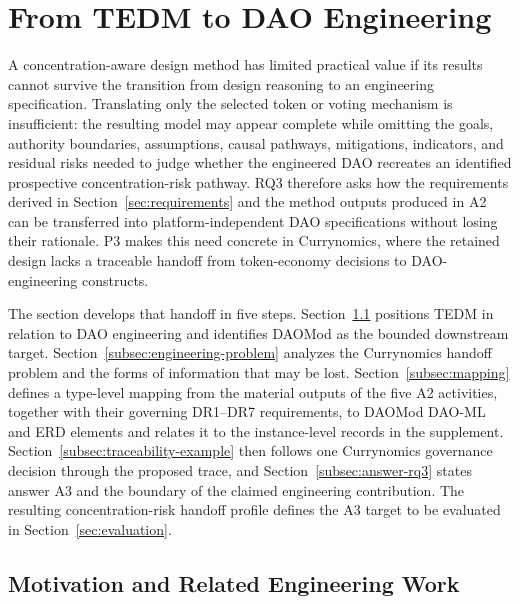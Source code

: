 \documentclass[referee,sn-basic]{sn-jnl}
\begin{document}
\section{From TEDM to DAO Engineering}\label{sec:engineering}

A concentration-aware design method has limited practical value if its results
cannot survive the transition from design reasoning to an engineering
specification. Translating only the selected token or voting mechanism is
insufficient: the resulting model may appear complete while omitting the goals,
authority boundaries, assumptions, causal pathways, mitigations, indicators,
and residual risks needed to judge whether the engineered DAO recreates an
identified prospective concentration-risk pathway. RQ3 therefore asks how the requirements derived in
Section~\ref{sec:requirements} and the method outputs produced in A2 can be transferred into
platform-independent DAO specifications without losing their rationale. P3
makes this need concrete in Currynomics, where the retained design lacks a
traceable handoff from token-economy decisions to DAO-engineering constructs.

The section develops that handoff in five steps. Section~\ref{subsec:engineering-motivation}
positions TEDM in relation to DAO engineering and identifies DAOMod as the
bounded downstream target. Section~\ref{subsec:engineering-problem} analyzes
the Currynomics handoff problem and the forms of information that may be lost.
Section~\ref{subsec:mapping} defines a type-level mapping from the material
outputs of the five A2 activities, together with their governing DR1--DR7
requirements, to DAOMod DAO-ML and ERD elements and relates it to the instance-level
records in the supplement. Section~\ref{subsec:traceability-example} then follows one
Currynomics governance decision through the proposed trace, and
Section~\ref{subsec:answer-rq3} states answer A3 and the boundary of the claimed
engineering contribution. The resulting concentration-risk handoff profile
defines the A3 target to be evaluated in Section~\ref{sec:evaluation}.

\subsection{Motivation and Related Engineering Work}\label{subsec:engineering-motivation}
\end{document}
